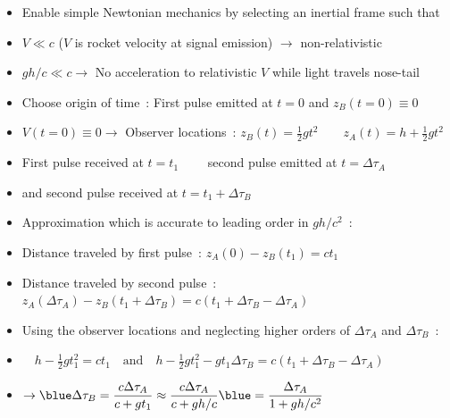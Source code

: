 \Tr
\begin{itemize}
\item Enable simple Newtonian mechanics by selecting an inertial frame such that
\item[] $V \ll c$ ($V$ is rocket velocity at signal emission) $\rightarrow$ non-relativistic
\item[] $gh/c \ll c \rightarrow$ No acceleration to relativistic $V$ while light travels nose-tail
\item Choose origin of time~: First pulse emitted at $t=0$ and $z_{B}(t=0) \equiv 0$
\item[] $V(t=0) \equiv 0 \rightarrow$ Observer locations~:
        {\blue $z_{B}(t)=\frac{1}{2}gt^{2} \qquad z_{A}(t)=h+\frac{1}{2}gt^{2}$}
\item[] First pulse received at $t=t_{1} \qquad$ second pulse emitted at $t=\Delta\tau_{A}$
\item[] and second pulse received at $t=t_{1}+\Delta\tau_{B}$
\item Approximation which is accurate to leading order in $gh/c^{2}$~:
\item[] Distance traveled by first pulse~: $z_{A}(0)-z_{B}(t_{1})=ct_{1}$
\item[] Distance traveled by second pulse~:
        $z_{A}(\Delta\tau_{A})-z_{B}(t_{1}+\Delta\tau_{B})=c(t_{1}+\Delta\tau_{B}-\Delta\tau_{A})$
\item[] Using the observer locations and neglecting higher orders of $\Delta\tau_{A}$ and $\Delta\tau_{B}$~:
\item[] $\quad h-\frac{1}{2}gt_{1}^{2}=ct_{1} \quad \text{and} \quad
        h-\frac{1}{2}gt_{1}^{2}-gt_{1}\Delta\tau_{B}=c(t_{1}+\Delta\tau_{B}-\Delta\tau_{A})$
\item[] $\rightarrow \displaystyle {\blue \Delta\tau_{B}} =\frac{c\Delta\tau_{A}}{c+gt_{1}}
         \approx \frac{c\Delta\tau_{A}}{c+gh/c} {\blue = \frac{\Delta\tau_{A}}{1+gh/c^{2}}}$
\end{itemize}

